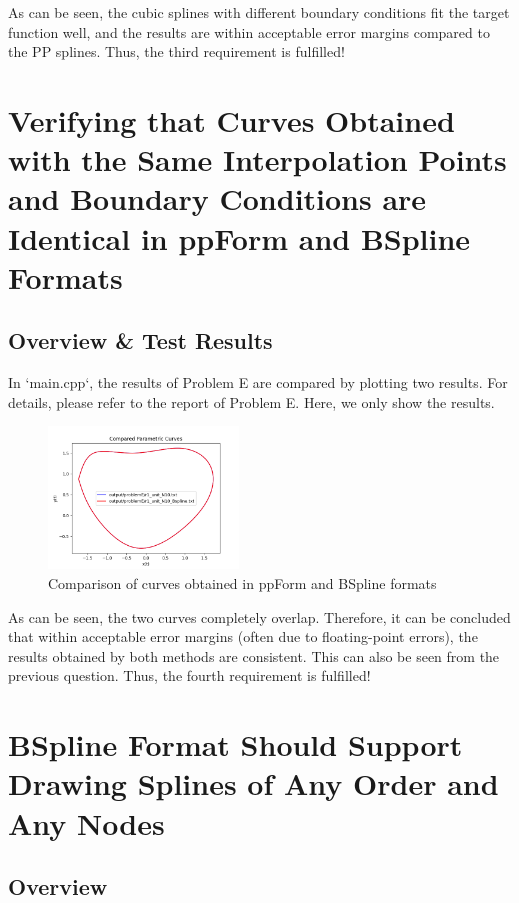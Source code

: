 \documentclass[a4paper]{article}
\begin{document}
As can be seen, the cubic splines with different boundary conditions fit the target function well, and the results are within acceptable error margins compared to the PP splines. Thus, the third requirement is fulfilled!

\section{Verifying that Curves Obtained with the Same Interpolation Points and Boundary Conditions are Identical in ppForm and BSpline Formats}

\subsection{Overview \& Test Results}

In `main.cpp`, the results of Problem E are compared by plotting two results. For details, please refer to the report of Problem E. Here, we only show the results.

\begin{figure}[H]
    \centering
    \includegraphics[width=0.45\textwidth]{./figure/check/P4_compare.png}
    \caption{Comparison of curves obtained in ppForm and BSpline formats}
\end{figure}

As can be seen, the two curves completely overlap. Therefore, it can be concluded that within acceptable error margins (often due to floating-point errors), the results obtained by both methods are consistent. This can also be seen from the previous question. Thus, the fourth requirement is fulfilled!

\section{BSpline Format Should Support Drawing Splines of Any Order and Any Nodes}

\subsection{Overview}
\end{document}
